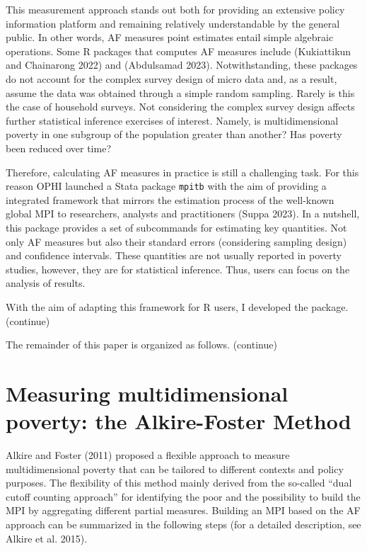 This measurement approach stands out both for providing an extensive policy information platform and remaining relatively understandable by the general public. In other words, AF measures point estimates entail simple algebraic operations. Some R packages that computes AF measures include  (Kukiattikun and Chainarong 2022) and  (Abdulsamad 2023). Notwithstanding, these packages do not account for the complex survey design of micro data and, as a result, assume the data was obtained through a simple random sampling. Rarely is this the case of household surveys. Not considering the complex survey design affects further statistical inference exercises of interest. Namely, is multidimensional poverty in one subgroup of the population greater than another? Has poverty been reduced over time?

Therefore, calculating AF measures in practice is still a challenging task. For this reason OPHI launched a Stata package \texttt{mpitb} with the aim of providing a integrated framework that mirrors the estimation process of the well-known global MPI to researchers, analysts and practitioners (Suppa 2023). In a nutshell, this package provides a set of subcommands for estimating key quantities. Not only AF measures but also their standard errors (considering sampling design) and confidence intervals. These quantities are not usually reported in poverty studies, however, they are for statistical inference. Thus, users can focus on the analysis of results.

With the aim of adapting this framework for R users, I developed the  package. (continue)

The remainder of this paper is organized as follows. (continue)

\hypertarget{measuring-multidimensional-poverty-the-alkire-foster-method}{%
\section{Measuring multidimensional poverty: the Alkire-Foster Method}\label{measuring-multidimensional-poverty-the-alkire-foster-method}}

Alkire and Foster (2011) proposed a flexible approach to measure multidimensional poverty that can be tailored to different contexts and policy purposes. The flexibility of this method mainly derived from the so-called ``dual cutoff counting approach'' for identifying the poor and the possibility to build the MPI by aggregating different partial measures. Building an MPI based on the AF approach can be summarized in the following steps (for a detailed description, see Alkire et al. 2015).

